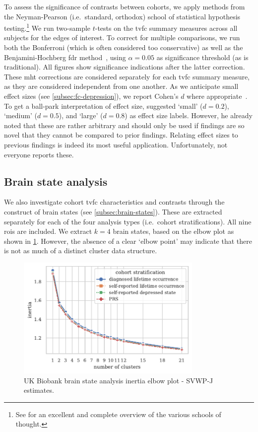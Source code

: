 To assess the significance of contrasts between cohorts, we apply methods from the Neyman-Pearson (i.e.~standard, orthodox) school of statistical hypothesis testing.\footnote{See \textcite{Dienes2008} for an excellent and complete overview of the various schools of thought.}
%
We run two-sample $t$-tests on the \gls{tvfc} summary measures across all subjects for the edges of interest.
To correct for multiple comparisons, we run both the Bonferroni (which is often considered too conservative) as well as the Benjamini-Hochberg \gls{fdr} method~\parencite{Benjamini1995}, using $\alpha = 0.05$ as significance threshold (as is traditional).
All figures show significance indications after the latter correction.
These \gls{mht} corrections are considered separately for each \gls{tvfc} summary measure, as they are considered independent from one another.
%
As we anticipate small effect sizes (see \cref{subsec:fc-depression}), we report Cohen's $d$ where appropriate~\parencite{Cohen1988, Lakens2013}.
To get a ball-park interpretation of effect size, \textcite{Cohen1988} suggested `small' ($d = 0.2$), `medium' ($d = 0.5$), and `large' ($d = 0.8$) as effect size labels.
However, he already noted that these are rather arbitrary and should only be used if findings are so novel that they cannot be compared to prior findings.
Relating effect sizes to previous findings is indeed its most useful application.
Unfortunately, not everyone reports these.

\subsection{Brain state analysis}

We also investigate cohort \gls{tvfc} characteristics and contrasts through the construct of brain states (see \cref{subsec:brain-states}).
These are extracted separately for each of the four analysis types (i.e.~cohort stratifications).
All nine \glspl{roi} are included.
%
We extract $k = 4$ brain states, based on the elbow plot as shown in \cref{fig:ukb-results-brain-states-elbow-plot}.
However, the absence of a clear `elbow point' may indicate that there is not as much of a distinct cluster data structure.


\begin{figure}[t]
  \centering
  \includegraphics[width=0.8\textwidth]{fig/ukbiobank/brain_states/inertias_SVWP_joint}
  \caption{
    UK Biobank brain state analysis inertia elbow plot - SVWP-J estimates.
  }
  \label{fig:ukb-results-brain-states-elbow-plot}
\end{figure}


